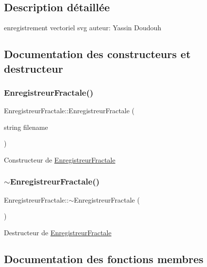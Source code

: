 \subsection{Description détaillée}
\textquotesingle{}enregistrement vectoriel svg auteur\+: Yassin Doudouh 

\subsection{Documentation des constructeurs et destructeur}
\mbox{\label{classEnregistreurFractale_a41e2b5d991a102bf7af1491b986ab8fb}} 
\subsubsection{\texorpdfstring{Enregistreur\+Fractale()}{EnregistreurFractale()}}
{\footnotesize\ttfamily Enregistreur\+Fractale\+::\+Enregistreur\+Fractale (\begin{DoxyParamCaption}\item[{string}]{filename }\end{DoxyParamCaption})}

Constructeur de \hyperlink{classEnregistreurFractale}{Enregistreur\+Fractale} \mbox{\label{classEnregistreurFractale_a5cb00738a4526c7bf1c93a84077cdb42}} 
\subsubsection{\texorpdfstring{$\sim$\+Enregistreur\+Fractale()}{~EnregistreurFractale()}}
{\footnotesize\ttfamily Enregistreur\+Fractale\+::$\sim$\+Enregistreur\+Fractale (\begin{DoxyParamCaption}{ }\end{DoxyParamCaption})}

Destructeur de \hyperlink{classEnregistreurFractale}{Enregistreur\+Fractale} 

\subsection{Documentation des fonctions membres}
\mbox{\label{classEnregistreurFractale_a594fe98fad6fe07acee198fb5de013ab}} 
